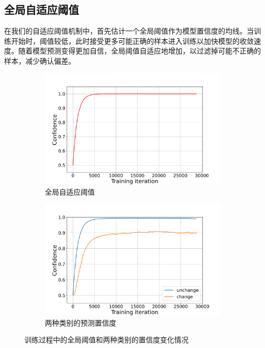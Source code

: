 \documentclass[lang=chs, degree=master, blindreview=false, adobe=false]{yanputhesis}
\begin{document}
\subsection{全局自适应阈值}
在我们的自适应阈值机制中，首先估计一个全局阈值作为模型置信度的均线。当训练开始时，阈值较低，此时接受更多可能正确的样本进入训练以加快模型的收敛速度。随着模型预测变得更加自信，全局阈值自适应地增加，以过滤掉可能不正确的样本，减少确认偏差。
\begin{figure}[htb]
  \centering
  \hspace*{\fill} %
  \begin{subfigure}[t]{0.46\textwidth} %
      \centering
      \includegraphics[scale=0.27]{images/adath_plot.png}
      \caption{全局自适应阈值}
      \label{fig:globalTh_left}
  \end{subfigure}
  \hfill %
  \begin{subfigure}[t]{0.46\textwidth} %
      \centering
      \includegraphics[scale=0.27]{images/prob_ema.png} %
      \caption{两种类别的预测置信度} %
      \label{fig:classTh_right}
  \end{subfigure}
  \hspace*{\fill} %
  \caption{训练过程中的全局阈值和两种类别的置信度变化情况}
  \label{fig:AdaTh_combined}
\end{figure}
\end{document}
